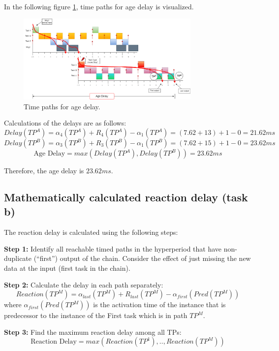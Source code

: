             In the following figure \ref{fig:agedelaypaths}, time paths for age delay is visualized.

            \begin{figure}[H]
                \centering
                \includegraphics[width=0.8\textwidth]{images/TimedPathAgeDelay.png}
                \caption{Time paths for age delay.}
                \label{fig:agedelaypaths}  
            \end{figure}

            Calculations of the delays are as follows:
            $$Delay(TP^A) = \alpha_4(TP^A) + R_4(TP^A) - \alpha_1(TP^A) = (7.62+13) + 1 - 0 = 21.62ms$$
            $$Delay(TP^B) = \alpha_3(TP^B) + R_3(TP^B) - \alpha_1(TP^B) = (7.62+15) + 1 - 0 = 23.62ms$$
            $$\text{Age Delay} = max(Delay(TP^A), Delay(TP^B)) = 23.62ms$$

            Therefore, the age delay is $23.62ms$.

        \subsection*{\textbf{Mathematically calculated reaction delay (task b)}}
            The reaction delay is calculated using the following steps:

            \textbf{Step 1:} Identify all reachable timed paths in the hyperperiod that have non-duplicate (“first”) output of the chain. Consider the effect of just missing the new data at the input (first task in the chain).

            \textbf{Step 2:} Calculate the delay in each path separately:
            $$Reaction(TP^M) = \alpha_{last}(TP^M) + R_{last}(TP^M) - \alpha_{first}(Pred(TP^M))$$
            where $\alpha_{first}(Pred(TP^M))$ is the activation time of the instance that is predecessor to the instance of the First task
            which is in path $TP^M$.

            \textbf{Step 3:} Find the maximum reaction delay among all TPs: 
            $$\text{Reaction Delay} = max(Reaction(TP^1),..,Reaction(TP^M))$$

